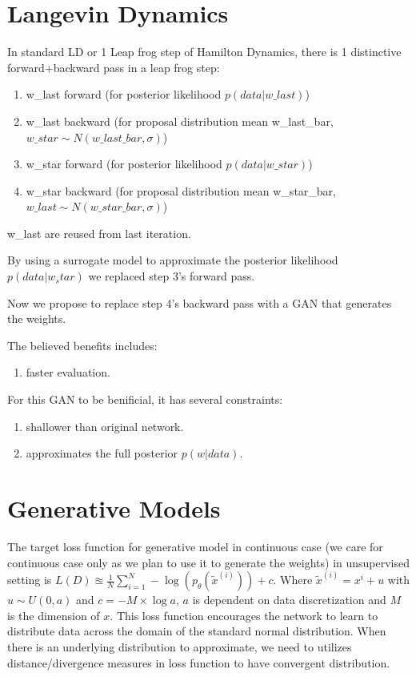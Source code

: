\documentclass[honours,12pt]{unswthesis}
\numberwithin{equation}{section}
\begin{document}
\section{Langevin Dynamics}
In standard LD or 1 Leap frog step of Hamilton Dynamics, there is 1 distinctive forward+backward pass in a leap frog step:

\begin{enumerate}
    \item w\_last forward (for posterior likelihood $p(data|w\_last)$)
    \item w\_last backward (for proposal distribution mean w\_last\_bar,$w\_star \sim N(w\_last\_bar,\sigma)$) 
    \item w\_star forward (for posterior likelihood $p(data|w\_star)$)
    \item w\_star backward (for proposal distribution mean w\_star\_bar,$w\_last \sim N(w\_star\_bar,\sigma)$) 
\end{enumerate}

w\_last are reused from last iteration.

By using a surrogate model to approximate the posterior likelihood $p(data|w_star)$ we replaced step 3's forward pass.

Now we propose to replace step 4's backward pass with a GAN that generates the weights.

The believed benefits includes:
\begin{enumerate}
\item faster evaluation.
\end{enumerate}

For this GAN to be benificial, it has several constraints: 
\begin{enumerate}
    \item shallower than original network.
    \item approximates the full posterior $p(w|data)$.
\end{enumerate}
    
\section{Generative Models}

The target loss function for generative model in continuous case (we care for continuous case only as we plan to use it to generate the weights) in unsupervised setting is $L(D) \approxeq \frac{1}{N}\sum_{i=1}^N - \log(p_\theta(\tilde{x}^{(i)}))+c$. Where $\tilde{x}^{(i)} = x^{i}+u$ with $u\sim U(0,a)$ and $c=-M\times \log{a}$, $a$ is dependent on data discretization and $M$ is the dimension of $x$. This loss function encourages the network to learn to distribute data across the domain of the standard normal distribution. When there is an underlying distribution to approximate, we need to utilizes distance/divergence measures in loss function to have convergent distribution.
\end{document}
